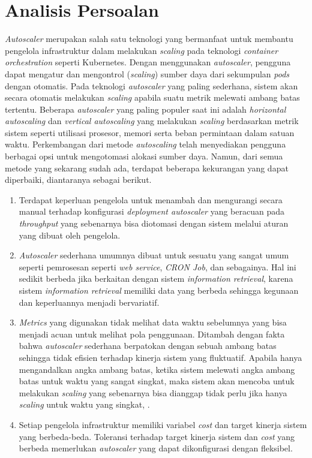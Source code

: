 \section{Analisis Persoalan}

\textit{Autoscaler} merupakan salah satu teknologi yang bermanfaat untuk membantu pengelola infrastruktur dalam melakukan \textit{scaling} pada teknologi \textit{container orchestration} seperti Kubernetes. Dengan menggunakan \textit{autoscaler}, pengguna dapat mengatur dan mengontrol (\textit{scaling}) sumber daya dari sekumpulan \textit{pods} dengan otomatis. Pada teknologi \textit{autoscaler} yang paling sederhana, sistem akan secara otomatis melakukan \textit{scaling} apabila suatu metrik melewati ambang batas tertentu. Beberapa \textit{autoscaler} yang paling populer saat ini adalah \textit{horizontal autoscaling} dan \textit{vertical autoscaling} yang melakukan \textit{scaling} berdasarkan metrik sistem seperti utilisasi prosesor, memori serta beban permintaan dalam satuan waktu. Perkembangan dari metode \textit{autoscaling} telah menyediakan pengguna berbagai opsi untuk mengotomasi alokasi sumber daya. Namun, dari semua metode yang sekarang sudah ada, terdapat beberapa kekurangan yang dapat diperbaiki, diantaranya sebagai berikut.

\begin{enumerate}
	\item Terdapat keperluan pengelola untuk menambah dan mengurangi secara manual terhadap konfigurasi \textit{deployment autoscaler} yang beracuan pada \textit{throughput} yang sebenarnya bisa diotomasi dengan sistem melalui aturan yang dibuat oleh pengelola.
	\item \textit{Autoscaler} sederhana umumnya dibuat untuk sesuatu yang sangat umum seperti pemrosesan seperti \textit{web service}, \textit{CRON Job}, dan sebagainya. Hal ini sedikit berbeda jika berkaitan dengan sistem \textit{information retrieval}, karena sistem \textit{information retrieval} memiliki data yang berbeda sehingga kegunaan dan keperluannya menjadi bervariatif.
	\item \textit{Metrics} yang digunakan tidak melihat data waktu sebelumnya yang bisa menjadi acuan untuk melihat pola penggunaan. Ditambah dengan fakta bahwa \textit{autoscaler} sederhana berpatokan dengan sebuah ambang batas sehingga tidak efisien terhadap kinerja sistem yang fluktuatif. Apabila hanya mengandalkan angka ambang batas, ketika sistem melewati angka ambang batas untuk waktu yang sangat singkat, maka sistem akan mencoba untuk melakukan \textit{scaling} yang sebenarnya bisa dianggap tidak perlu jika hanya \textit{scaling} untuk waktu yang singkat, \parencite{riset1}.
	\item Setiap pengelola infrastruktur memiliki variabel \textit{cost} dan target kinerja sistem yang berbeda-beda. Toleransi terhadap target kinerja sistem dan \textit{cost} yang berbeda memerlukan \textit{autoscaler} yang dapat dikonfigurasi dengan fleksibel.
\end{enumerate}

